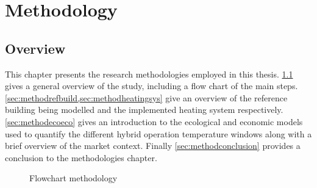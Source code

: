 \chapter{Methodology}\label{ch:method} 
\section{Overview} \label{sec:methodoverview}
This chapter presents the research methodologies employed in this thesis. \cref{sec:methodoverview} gives a general overview of the study, including a flow chart of the main steps. \cref{sec:methodrefbuild,sec:methodheatingsys} give an overview of the reference building being modelled and the implemented heating system respectively. \cref{sec:methodecoeco} gives an introduction to the ecological and economic models used to quantify the different hybrid operation temperature windows along with a brief overview of the market context. Finally \cref{sec:methodconclusion} provides a conclusion to the methodologies chapter.

\begin{figure}[htb]
    \centering
    
    \caption{Flowchart methodology}
    \label{fig:flowchartmethod}
\end{figure}




